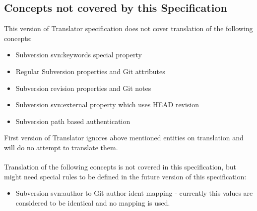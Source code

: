 \subsection{Concepts not covered by this Specification}
This version of Translator specification does not cover translation of the following concepts:
\begin{itemize}
\item Subversion svn:keywords special property
\item Regular Subversion properties and Git attributes
\item Subversion revision properties and Git notes
\item Subversion svn:external property which uses HEAD revision
\item Subversion path based authentication
\end{itemize}

First version of Translator ignores above mentioned entities on translation and will do no attempt to translate them.
\\\\
Translation of the following concepts is not covered in this specification, but might need special
rules to be defined in the future version of this specification:
\begin{itemize}
\item Subversion svn:author to Git author ident mapping - currently this values are considered to be identical and no
mapping is used.
\end{itemize}